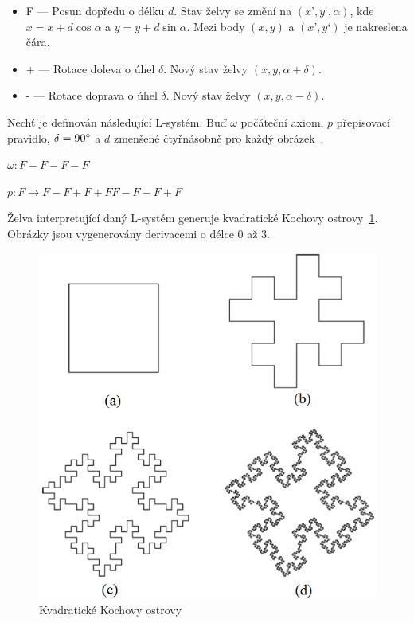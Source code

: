 \documentclass[thesis=M,czech]{FITthesis}[2019/12/23]
\begin{document}
\begin{itemize}
\item F --- Posun dopředu o délku $d$. Stav želvy se změní na $(x’, y‘, \alpha)$, kde $x = x + d \cos \alpha$ a $y = y + d \sin \alpha$. Mezi body $(x, y)$ a $(x’, y‘)$ je nakreslena čára.
\item + --- Rotace doleva o úhel $\delta$. Nový stav želvy $(x, y, \alpha + \delta)$.
\item - --- Rotace doprava o úhel $\delta$. Nový stav želvy $(x, y, \alpha - \delta)$.
\end{itemize}

Nechť je definován následující L-systém. Buď $\omega$ počáteční axiom, $p$ přepisovací pravidlo, $\delta = 90\degree$ a $d$ zmenšené čtyřnásobně pro každý obrázek~\cite{abop7}.

\bigskip
$\omega: F-F-F-F$

\medskip
$p: F \rightarrow F-F+F+FF-F-F+F$

\bigskip
Želva interpretující daný L-systém generuje kvadratické Kochovy ostrovy~\ref{fig:koch_island}. Obrázky jsou vygenerovány derivacemi o délce 0 až 3.

\begin{figure}\centering
	\includegraphics[width=\textwidth]{images/koch_island}
	\caption[Kvadratické Kochovy ostrovy]{Kvadratické Kochovy ostrovy}\label{fig:koch_island}
\end{figure}
\end{document}
